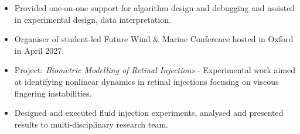 \documentclass{cv}
\renewcommand{\cvitemskip}{\vspace{0.8em}}
\begin{document}
\vspace{-0.5em}
\begin{itemize}
	\item Provided one‑on‑one support for algorithm design and debugging and assisted in experimental design, data interpretation.
\end{itemize}
\cvitemskip

\begin{itemize}
	\item Organiser of student-led Future Wind \& Marine Conference hosted in Oxford in April 2027.
\end{itemize}
\cvitemskip

\begin{itemize}
	\item Project: \textit{Biometric Modelling of Retinal Injections} - Experimental work aimed at identifying nonlinear dynamics in retinal injections focusing on viscous fingering instabilities.
	\item Designed and executed fluid injection experiments, analysed and presented results to multi-disciplinary research team.
\end{itemize}

\end{document}
